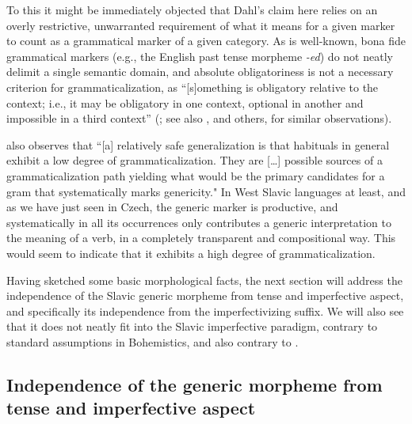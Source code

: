\documentclass[output=paper,colorlinks,citecolor=brown]{langscibook}
\begin{document}
To this it might be immediately objected that Dahl's claim
here relies on an overly restrictive, unwarranted
requirement of what it means for a given marker to count as a grammatical marker of a given category. As is well-known, bona fide grammatical markers (e.g., the English past tense morpheme \textit{-ed}) do not neatly delimit a single semantic domain, and absolute obligatoriness is not a necessary criterion for grammaticalization, as “[s]omething is obligatory relative to the context; i.e., it may be obligatory in one context, optional in another and impossible in a third context” (\citealt[12]{lehmann1995}; see also \citealt{heine2002kuteva,heine2007kuteva}, and others, for similar observations).

\citet[421]{dahl1995} also observes that ``[a] relatively safe generalization is that habituals in general exhibit a low degree of grammaticalization. They are [\dots] possible sources of a grammaticalization path yielding what would be the primary candidates for a gram that systematically marks genericity."  In West Slavic languages at least, and as we have just seen in Czech, the generic marker is productive, and systematically in all its occurrences only contributes a generic interpretation to the meaning of a verb, in a completely transparent and compositional way. This would seem to indicate that it exhibits a high degree of grammaticalization.

Having sketched some basic morphological facts, the next section will address the independence of the Slavic generic morpheme from tense and imperfective aspect, and specifically its independence 
from the imperfectivizing suffix. We will also see that it does not neatly fit into the Slavic imperfective paradigm, contrary to standard assumptions in Bohemistics, and also contrary to \citet{dahl1995}.




\subsection  {Independence of the generic morpheme from tense and imperfective aspect} 
\end{document}
